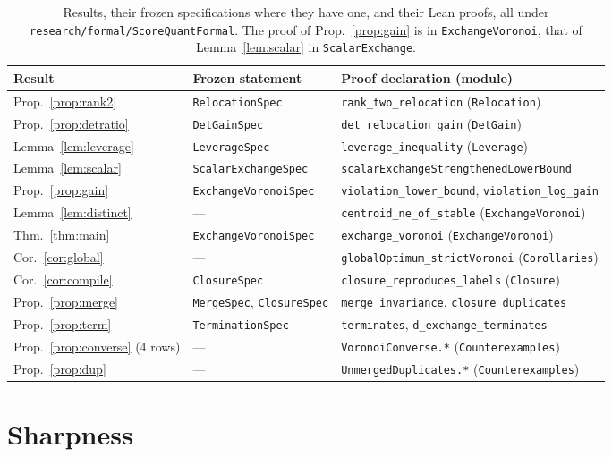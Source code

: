 \documentclass[11pt]{amsart}
\theoremstyle{definition}
\theoremstyle{remark}
\begin{document}
\begin{table}[t]
\centering
\small
\begin{tabular}{@{}lll@{}}
\toprule
Result & Frozen statement & Proof declaration (module) \\
\midrule
Prop.~\ref{prop:rank2} & \texttt{RelocationSpec} & \texttt{rank\_two\_relocation} (\texttt{Relocation}) \\
Prop.~\ref{prop:detratio} & \texttt{DetGainSpec} & \texttt{det\_relocation\_gain} (\texttt{DetGain}) \\
Lemma~\ref{lem:leverage} & \texttt{LeverageSpec} & \texttt{leverage\_inequality} (\texttt{Leverage}) \\
Lemma~\ref{lem:scalar} & \texttt{ScalarExchangeSpec} & \texttt{scalarExchangeStrengthenedLowerBound} \\
Prop.~\ref{prop:gain} & \texttt{ExchangeVoronoiSpec} & \texttt{violation\_lower\_bound}, \texttt{violation\_log\_gain} \\
Lemma~\ref{lem:distinct} & --- & \texttt{centroid\_ne\_of\_stable} (\texttt{ExchangeVoronoi}) \\
Thm.~\ref{thm:main} & \texttt{ExchangeVoronoiSpec} & \texttt{exchange\_voronoi} (\texttt{ExchangeVoronoi}) \\
Cor.~\ref{cor:global} & --- & \texttt{globalOptimum\_strictVoronoi} (\texttt{Corollaries}) \\
Cor.~\ref{cor:compile} & \texttt{ClosureSpec} & \texttt{closure\_reproduces\_labels} (\texttt{Closure}) \\
Prop.~\ref{prop:merge} & \texttt{MergeSpec}, \texttt{ClosureSpec} & \texttt{merge\_invariance}, \texttt{closure\_duplicates} \\
Prop.~\ref{prop:term} & \texttt{TerminationSpec} & \texttt{terminates}, \texttt{d\_exchange\_terminates} \\
Prop.~\ref{prop:converse} (4 rows) & --- & \texttt{VoronoiConverse.*} (\texttt{Counterexamples}) \\
Prop.~\ref{prop:dup} & --- & \texttt{UnmergedDuplicates.*} (\texttt{Counterexamples}) \\
\bottomrule
\end{tabular}
\caption{Results, their frozen specifications where they have one, and their Lean proofs, all
under \texttt{research/formal/ScoreQuantFormal}. The proof of Prop.~\ref{prop:gain} is in
\texttt{ExchangeVoronoi}, that of Lemma~\ref{lem:scalar} in \texttt{ScalarExchange}.}
\label{tab:lean}
\end{table}

\section{Sharpness}\label{sec:sharp}
\end{document}
